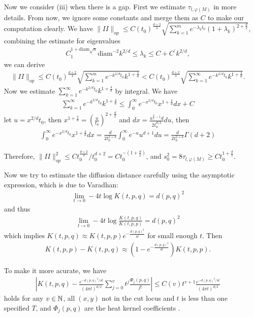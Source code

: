 Now we consider (iii) when there is a gap. First we estimate $\tau_{l,\varphi(M)}$ in more details. From now, we ignore some constants and merge them as $C$ to make our computation clearly. We have $\| II\|_{op} \leq C(t_0)^{\frac{d+2}{4}} \sqrt{\sum_{k=1}^{m}e^{-\lambda_k t_0} (1+\lambda_k)^{2+\frac{d}{2}}}$, combining the estimate for eigenvalues
\begin{align}
C_1^{1+\text{diam}\sqrt{\kappa}} \text{diam}^{-2} k^{2/d} \leq \lambda_k \leq C+C^\prime k^{2/d},
\end{align}
we can derive
\begin{align}
\|II\|_{op} \leq C (t_0)^{\frac{d+2}{4}}\sqrt{\sum_{k=1}^{m}e^{-k^{2/d} t_0} k^{1+\frac{4}{d}}} < C (t_0)^{\frac{d+2}{4}}\sqrt{\sum_{k=1}^{\infty}e^{-k^{2/d} t_0} k^{1+\frac{4}{d}}}.
\end{align} 
Now we estimate $\sum_{k=1}^{\infty}e^{-k^{2/d} t_0} k^{1+\frac{4}{d}}$ by integral. We have 
\begin{align}
	\sum_{k=1}^{\infty}e^{-k^{2/d} t_0} k^{1+\frac{4}{d}} \leq  \int_{0}^{\infty} e^{-x^{2/d} t_0} x^{1+\frac{4}{d}}dx + C
\end{align}
let $u = x^{2/d} t_0$, then $x^{1+\frac{4}{d}} = (\frac{u}{t_0})^{2+\frac{d}{2}}$ and $dx = \frac{u^{\frac{d}{2}-1}d}{2 t_0^{d/2}} du$, then 
\begin{align}
	\int_{0}^{\infty} e^{-x^{2/d} t_0} x^{1+\frac{4}{d}}dx = \frac{d}{2t_0^{2+d}}\int_{0}^{\infty} e^{-u} u^{d+1} du = \frac{d}{2t_0^{2+d}}\Gamma(d+2)
\end{align}

Therefore, $\|II\|_{op}^2 \leq Ct_0^{\frac{d+2}{2}}/t_0^{d+2} = Ct_0^{-(1+\frac{d}{2})}$, and $s_0^2 = 8 \tau_{l,\varphi(M)} \geq C t_0^{1+\frac{d}{2}}$.

Now we try to estimate the diffusion distance carefully using the asymptotic expression, which is due to Varadhan:
\begin{align}
	\lim_{t \to 0} -4t \log K(t,p,q) = d(p,q)^2
\end{align}
and thus
\begin{align}
	\lim_{t \to 0} -4t \log \frac{K(t,p,q)}{K(t,p,p)} = d(p,q)^2
\end{align}
which implies $K(t,p,q) \approx K(t,p,p) e^{-\frac{d(p,q)^2}{4t}}$ for small enough $t$. Then 
\begin{align}
	K(t,p,p) - K(t,p,q) \approx (1 - e^{-\frac{d(p,q)^2}{4t}}) K(t,p,p).
\end{align}

To make it more acurate, we have 
\begin{align}
	\label{eq:heatkernelcoef}
	\left|K(t,p,q)- \frac{e^{-d(p,q)^2/4t}}{(4\pi t)^{d/2}}\sum_{j=0}^{v} t^j \frac{\Phi_j(p,q)}{j !}\right| \leq C(v) t^{v+1} \frac{e^{-d(p,q)^2/4t}}{(4\pi t)^{d/2}}
\end{align}
holds for any $v \in \mathbb{N}$, all $(x,y)$ not in the cut locus and $t$ is less than one specified $T$, and $\Phi_j(p,q)$ are the heat kernel coefficients \cite{ludewig2019strong}.

